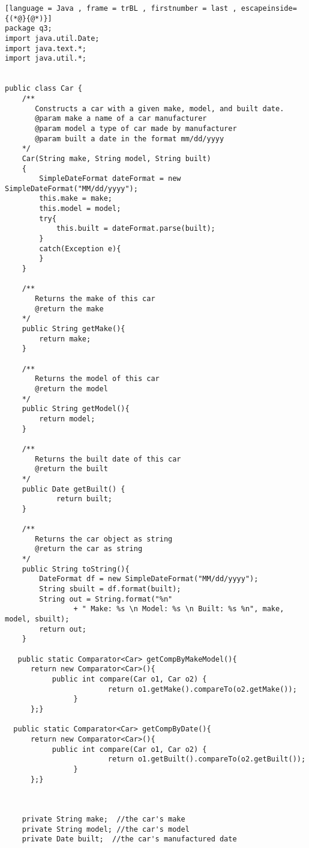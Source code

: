 \begin{enumerate}[label=(\alph*),align=left, wide, labelwidth=!, labelindent=0pt]
\newpage
\begin{lstlisting}[language = Java , frame = trBL , firstnumber = last , escapeinside={(*@}{@*)}]
package q3;
import java.util.Date;
import java.text.*;
import java.util.*; 


public class Car {
    /**
       Constructs a car with a given make, model, and built date.
       @param make a name of a car manufacturer
       @param model a type of car made by manufacturer
       @param built a date in the format mm/dd/yyyy
    */
    Car(String make, String model, String built)
    { 
        SimpleDateFormat dateFormat = new SimpleDateFormat("MM/dd/yyyy");
        this.make = make;
        this.model = model;        
        try{
            this.built = dateFormat.parse(built);
        }
        catch(Exception e){  
        }        
    } 
    
    /**
       Returns the make of this car
       @return the make
    */
    public String getMake(){
        return make;
    }
    
    /**
       Returns the model of this car
       @return the model
    */
    public String getModel(){
        return model;
    }
    
    /**
       Returns the built date of this car
       @return the built
    */
    public Date getBuilt() {
            return built;
    }

    /**
       Returns the car object as string
       @return the car as string
    */
    public String toString(){
        DateFormat df = new SimpleDateFormat("MM/dd/yyyy");
        String sbuilt = df.format(built);
        String out = String.format("%n"
                + " Make: %s \n Model: %s \n Built: %s %n", make, model, sbuilt);
        return out;
    }
    
   public static Comparator<Car> getCompByMakeModel(){       
      return new Comparator<Car>(){
           public int compare(Car o1, Car o2) {
                        return o1.getMake().compareTo(o2.getMake());
                }
      };}
   
  public static Comparator<Car> getCompByDate(){       
      return new Comparator<Car>(){
           public int compare(Car o1, Car o2) {
                        return o1.getBuilt().compareTo(o2.getBuilt());
                }
      };}
 
    
   
    private String make;  //the car's make
    private String model; //the car's model
    private Date built;  //the car's manufactured date
    

\end{lstlisting}
\end{enumerate}
